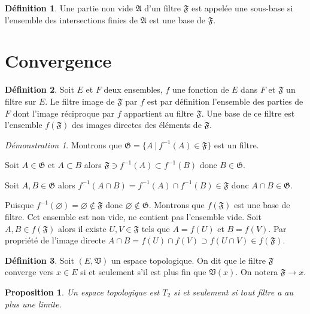 \documentclass[a4paper, 11pt, french]{book}
\newenvironment{itemise}{\itemize}{\enditemize}
\theoremstyle{plain} %
\newtheorem{proposition}{Proposition}
\theoremstyle{definition} %
\newtheorem{definition}{Définition}
\theoremstyle{remark} %
\newtheorem*{demonstration}{Démonstration}
\newcommand{\1}{\mathds{1}}
\newcommand\vide{\varnothing}
\renewcommand{\frak}[1]{\mathfrak{#1}}
\newcommand\ens[2]{\{#1 \ |\ #2\}}
\begin{document}
\begin{definition}
	Une partie non vide $\frak{A}$ d'un filtre $\frak{F}$ est appelée une sous-base si l'ensemble des intersections finies de $\frak{A}$ est une base de $\frak{F}$.
\end{definition}

\section{Convergence}

\begin{definition}
	Soit $E$ et $F$ deux ensembles, $f$ une fonction de $E$ dans $F$ et $\frak{F}$ un filtre sur $E$.
	Le filtre image de $\frak{F}$ par $f$ est par définition l'ensemble des parties de $F$ dont l'image réciproque par $f$ appartient au filtre $\frak{F}$.
	Une base de ce filtre est l'ensemble $f(\frak{F})$ des images directes des éléments de $\frak{F}$.
\end{definition}

\begin{demonstration}
	Montrons que $\frak{G}=\ens{A}{f^{-1}(A)\in\frak{F}}$ est un filtre.
	\begin{itemise}
		\item Soit $A\in\frak{G}$ et $A\subset B$ alors $\frak{F}\ni f^{-1}(A)\subset f^{-1}(B)$ donc $B\in\frak{G}$.
		\item Soit $A, B\in\frak{G}$ alors $f^{-1}(A\cap B)=f^{-1}(A)\cap f^{-1}(B)\in\frak{F}$ donc $A\cap B\in\frak{G}$.
		\item Puisque $f^{-1}(\vide)=\vide\notin\frak{F}$ donc $\vide\notin\frak{G}$.
	\end{itemise}
	Montrons que $f(\frak{F})$ est une base de filtre.
	Cet ensemble est non vide, ne contient pas l'ensemble vide.
	Soit $A, B\in f(\frak{F})$ alors il existe $U, V\in\frak{F}$ tels que $A=f(U)$ et $B=f(V)$.
	Par propriété de l'image directe $A\cap B=f(U)\cap f(V)\supset f(U\cap V)\in f(\frak{F})$.
\end{demonstration}

\begin{definition}
	Soit $(E, \frak{V})$ un espace topologique.
	On dit que le filtre $\frak{F}$ converge vers $x\in E$ si et seulement s'il est plus fin que $\frak{V}(x)$.
	On notera $\frak{F}\rightarrow x$.
\end{definition}

\begin{proposition}
	Un espace topologique est $T_2$ si et seulement si tout filtre a au plus une limite.
\end{proposition}
\end{document}
